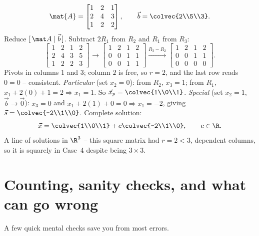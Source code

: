 \begin{example}
\label{ch13:square}
\[
  \mat{A}=\begin{bmatrix}1&2&1\\2&4&3\\1&2&2\end{bmatrix},\qquad
  \vec{b}=\colvec{2\\5\\3}.
\]
Reduce $[\,\mat A\mid\vec b\,]$. Subtract $2R_1$ from $R_2$ and $R_1$ from $R_3$:
\[
  \left[\begin{array}{ccc|c}1&2&1&2\\2&4&3&5\\1&2&2&3\end{array}\right]
  \longrightarrow
  \left[\begin{array}{ccc|c}1&2&1&2\\0&0&1&1\\0&0&1&1\end{array}\right]
  \xrightarrow{R_3-R_2}
  \left[\begin{array}{ccc|c}1&2&1&2\\0&0&1&1\\0&0&0&0\end{array}\right].
\]
Pivots in columns $1$ and $3$; column $2$ is free, so $r=2$, and the last row reads $0=0$
-- consistent. \emph{Particular} (set $x_2=0$): from $R_2$, $x_3=1$; from $R_1$,
$x_1+2(0)+1=2\Rightarrow x_1=1$. So $\vec{x}_p=\colvec{1\\0\\1}$. \emph{Special} (set
$x_2=1$, $\vec b\to\vec 0$): $x_3=0$ and $x_1+2(1)+0=0\Rightarrow x_1=-2$, giving
$\vec{s}=\colvec{-2\\1\\0}$. Complete solution:
\[
  \vec{x}=\colvec{1\\0\\1}+c\colvec{-2\\1\\0},\qquad c\in\R.
\]
A line of solutions in $\R^3$ -- this square matrix had $r=2<3$, dependent columns, so it
is squarely in Case~4 despite being $3\times 3$.
\end{example}

\section{Counting, sanity checks, and what can go wrong}

A few quick mental checks save you from most errors.

